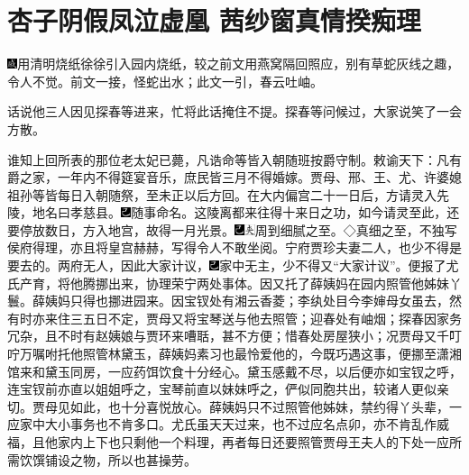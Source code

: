

\chapter{杏子阴假凤泣虚凰 茜纱窗真情揆痴理}

{\includegraphics[width=3mm]{../Images/00005}用清明烧纸徐徐引入园内烧纸，较之前文用燕窝隔回照应，别有草蛇灰线之趣，令人不觉。前文一接，怪蛇出水；此文一引，春云吐岫。}

话说他三人因见探春等进来，忙将此话掩住不提。探春等问候过，大家说笑了一会方散。

谁知上回所表的那位老太妃已薨，凡诰命等皆入朝随班按爵守制。敕谕天下：凡有爵之家，一年内不得筵宴音乐，庶民皆三月不得婚嫁。贾母、邢、王、尤、许婆媳祖孙等皆每日入朝随祭，至未正以后方回。在大内偏宫二十一日后，方请灵入先陵，地名曰孝慈县。{\includegraphics[width=3mm]{../Images/00003}随事命名。}这陵离都来往得十来日之功，如今请灵至此，还要停放数日，方入地宫，故得一月光景。{\includegraphics[width=3mm]{../Images/00003}\includegraphics[width=3mm]{../Images/00012}\footnotesize \kaishu 周到细腻之至。◇真细之至，不独写侯府得理，亦且将皇宫赫赫，写得令人不敢坐阅。}宁府贾珍夫妻二人，也少不得是要去的。两府无人，因此大家计议，{\includegraphics[width=3mm]{../Images/00003}家中无主，少不得又``大家计议''。}便报了尤氏产育，将他腾挪出来，协理荣宁两处事体。因又托了薛姨妈在园内照管他姊妹丫鬟。薛姨妈只得也挪进园来。因宝钗处有湘云香菱；李纨处目今李婶母女虽去，然有时亦来住三五日不定，贾母又将宝琴送与他去照管；迎春处有岫烟；探春因家务冗杂，且不时有赵姨娘与贾环来嘈聒，甚不方便；惜春处房屋狭小；况贾母又千叮咛万嘱咐托他照管林黛玉，薛姨妈素习也最怜爱他的，今既巧遇这事，便挪至潇湘馆来和黛玉同房，一应药饵饮食十分经心。黛玉感戴不尽，以后便亦如宝钗之呼，连宝钗前亦直以姐姐呼之，宝琴前直以妹妹呼之，俨似同胞共出，较诸人更似亲切。贾母见如此，也十分喜悦放心。薛姨妈只不过照管他姊妹，禁约得丫头辈，一应家中大小事务也不肯多口。尤氏虽天天过来，也不过应名点卯，亦不肯乱作威福，且他家内上下也只剩他一个料理，再者每日还要照管贾母王夫人的下处一应所需饮馔铺设之物，所以也甚操劳。

